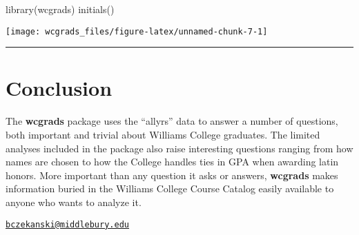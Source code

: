 \begin{Schunk}
\begin{Sinput}
library(wcgrads)
initials()
\end{Sinput}

\texttt{[image: wcgrads\_files/figure-latex/unnamed-chunk-7-1]} \end{Schunk}

\begin{center}\rule{0.5\linewidth}{\linethickness}\end{center}

\section{Conclusion}\label{conclusion}

The \textbf{wcgrads} package uses the ``allyrs'' data to answer a number
of questions, both important and trivial about Williams College
graduates. The limited analyses included in the package also raise
interesting questions ranging from how names are chosen to how the
College handles ties in GPA when awarding latin honors. More important
than any question it asks or answers, \textbf{wcgrads} makes information
buried in the Williams College Course Catalog easily available to anyone
who wants to analyze it.

\address{%
Ben Czekanski\\
Middlebury College '18\\
\\
}
\href{mailto:bczekanski@middlebury.edu}{\nolinkurl{bczekanski@middlebury.edu}}


